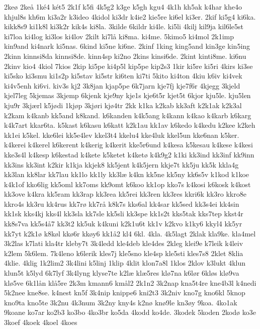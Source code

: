 2ke^^f8
2ke^^e5
1k^^e94
k^^e9t5
2k1f
k5fi
4k5g2
k3ge
k5gh
kgu4
4k1h
kh5ak
k4har
khe4o
khjul8s
kh6m
ki3a2r
k3ideo
4kidol
ki3dr
k4ie2
kie5re
ki6el
ki3er.
2kif
ki5g4
ki6ka.
kikk8s9
ki1k8l
ki3k2r
kik4s
ki8la.
3kilde
6kildr
ki4le.
ki5li
4kilj
kil9ja
kil6le5st
ki7loa
ki4log
ki3los
ki4lov
2kilt
ki7l^^e5
ki8ma.
ki4me.
5kimo5
ki4mol
2k1imp
kin9and
ki4nark
ki5nas.
6kind
ki5ne
ki6ne.
2kinf
1king
king5and
kin3ge
kin5ing
2kinn
kinnsi8da
kinnsi8de.
kinn4sp
ki2no
2kins
kinsi6de.
2kint
kinti8me.
ki6nu
2kinv
kio4
4kiol
7kios
2kip
ki5pe
ki4p5l
kip5pe
kip2s3
1kir
ki5re
ki5ri
4kirs
ki3se
ki5sko
ki3smu
ki1s2p
ki5stav
ki5str
ki6ten
ki7ti
5kito
ki4ton
4kiu
k6iv
ki4vek
ki4v5enh
ki6vi.
kiv3s
kj2
3k8jan
kjap5pe
6k7jarn
kje7fj
kje7f6r
4kjegg
3kjeld
kjel7leg
5kjemas
3kjemp
6kjenk
kje9ny
kje1s
kje6t5r
kjet5t
6kjor
kju5le.
kju5len
kju9r
3kj^^e6rl
k5j^^f8di
1kj^^f8p
3kj^^f8ri
kj^^f84tr
2kk
k1ka
k2kab
kk3aft
k2k1ak
k2k3al
k2kam
k4kanb
kk5and
k8kand.
k6kanden
k4k5ang
k4kann
k4kao
k4karb
k6karg
k4k7art
kkar6ta.
k5kast
k6kasu
k6katt
k2k1au
kk1av
k6kedo
k4kedu
k2kee
k2keh
kk1ei
k5kel.
kke6lei
kk5e4lev
kkel3t4
kkelu4
kke4luk
kkel5un
kke6nan
k5ker.
k4kerei
k4kerel
k6kerent
k4kerig
k4kerit
kke5r6und
k4kesa
k5kesau
k4kese
k4kesi
kke3s4l
k4kesp
k6kestad
k4kete
k5ketet
k4ket^^f8
k4k9g2
k1ki
kk3ind
kk3inf
kk9inn
kk3ins
kk3int
k2kir
k1kja
kkjek8
kk5jent
k4k5jern
kkje7t
kk5ju
kk5k
kkla4g
kk3lan
kk8lar
kk7lau
kk1lo
kk1ly
kk3l^^e6
k4kn
kk5ne
kk5ny
kk6s5v
k1kod
k1koe
k4k1of
kko6lig
kk5oml
kk7oms
kk9omt
k6koo
kk1op
kko7s
k4kosi
k6kosk
k4kost
kk3ove
k4kra
kk5ram
kk3rap
kk3rea
kk5rei
kk3ren
kk3res
kkri6k
kk3ro
kkro8e
kkro4s
kk3ru
kk4rus
kk7r^^f8
kk7r^^e5
k8k7s
kks6al
kk4sar
kk5sed
kk3s4ei
kk4sin
kk1sk
kks4kj
kks4l
kk3sla
kk7sle
kk5sli
kk3spe
kk1s2t
kks5tak
kks7tep
kkst4r
kk8s7va
kk5s4^^e57
kk3t2
kk5uk
k4kuni
k2k1u6t
kk1v
k2kvo
k1ky6
kkyl4
kk5yr
kk7yt
k2k1^^f8
k8k^^f8l
kk^^f86r
kk^^f8y6
kk1^^e52
kl4
6kl.
4kla.
4k5lagt
2klak
kla9ke.
kla4mel
3k2las
k7lati
kla4tr
kleby7t
3k4ledd
kle4deb
kle4des
2kleg
klei9e
k7leik
k4leiv
k2lem
5k6lem.
7k4leno
k6lerik
kles7j
kle5sno
kle4sp
kle5sti
kles7s8
2klet
8klia
4klie.
4klig
1k2lim2
3k4lini
k5linj
1klip
4klit
klon7a8l
1klos
2klov
k3lukt
4klun
klun5t
k5lyd
6k7lyf
3k4lyng
klyse7te
k2l^^e6
kl^^e65res
kl^^f87na
k6l^^f8r
6kl^^f8s
kl^^f89va
kl^^f85ve
6k1l^^e5n
kl^^e55re
2k3m
kmann6
km^^e5l2
2k1n2
3k2nap
kna5t4re
kne4b3l
k4nedi
5k2nee
kne8se.
k4nest
kn5f
3k4nip
knippe6
kni2t3
3k2niv
kno7g
kno6kl
5knop
kno9ta
kno5te
3k2nu
4k3num
3k2ny
kny4s
k2n^^f8
kn^^f89le
kn3^^f8y
9koa.
4ko1ak
9koane
ko7ar
ko2b3
ko3bo
4ko3br
ko5da
4kodd
ko4de.
3kodek
5koden
2kod^^f8
ko3e
3koef
4koek
4koel
4koes
